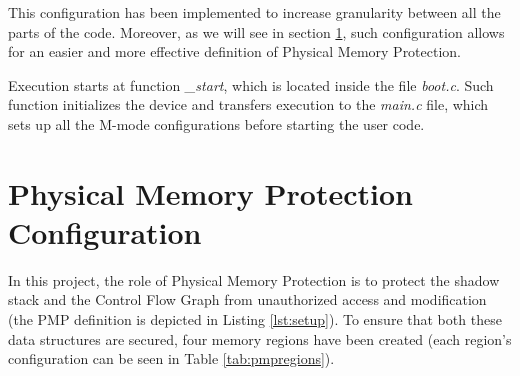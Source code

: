 This configuration has been implemented to increase granularity between all the parts
of the code. Moreover, as we will see in section \ref{sec:project_pmp}, such
configuration allows for an easier and more effective definition of Physical
Memory Protection.

Execution starts at function \textit{\_start}, which is located inside the file
\textit{boot.c}. Such function initializes the device and transfers execution to
the \textit{main.c} file, which sets up all the M-mode configurations before
starting the user code.

\section{Physical Memory Protection Configuration}
\label{sec:project_pmp}

In this project, the role of Physical Memory Protection is to protect the shadow
stack and the Control Flow Graph from unauthorized access and modification (the PMP
definition is depicted in Listing \ref{lst:setup}). To ensure that both these data
structures are secured, four memory regions have been created (each region's configuration
can be seen in Table \ref{tab:pmpregions}).

